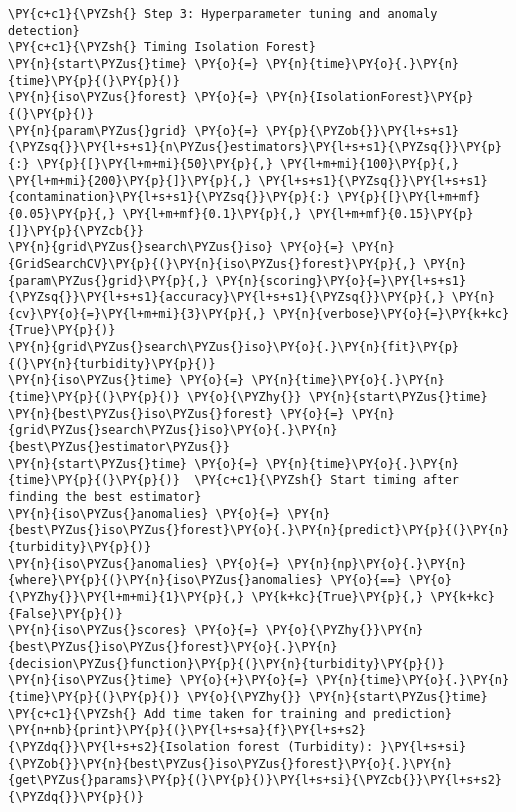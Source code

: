 \begin{tcolorbox}[breakable, size=fbox, boxrule=1pt, pad at break*=1mm,colback=cellbackground, colframe=cellborder]
\begin{Verbatim}[commandchars=\\\{\}]
\PY{c+c1}{\PYZsh{} Step 3: Hyperparameter tuning and anomaly detection}
\PY{c+c1}{\PYZsh{} Timing Isolation Forest}
\PY{n}{start\PYZus{}time} \PY{o}{=} \PY{n}{time}\PY{o}{.}\PY{n}{time}\PY{p}{(}\PY{p}{)}
\PY{n}{iso\PYZus{}forest} \PY{o}{=} \PY{n}{IsolationForest}\PY{p}{(}\PY{p}{)}
\PY{n}{param\PYZus{}grid} \PY{o}{=} \PY{p}{\PYZob{}}\PY{l+s+s1}{\PYZsq{}}\PY{l+s+s1}{n\PYZus{}estimators}\PY{l+s+s1}{\PYZsq{}}\PY{p}{:} \PY{p}{[}\PY{l+m+mi}{50}\PY{p}{,} \PY{l+m+mi}{100}\PY{p}{,} \PY{l+m+mi}{200}\PY{p}{]}\PY{p}{,} \PY{l+s+s1}{\PYZsq{}}\PY{l+s+s1}{contamination}\PY{l+s+s1}{\PYZsq{}}\PY{p}{:} \PY{p}{[}\PY{l+m+mf}{0.05}\PY{p}{,} \PY{l+m+mf}{0.1}\PY{p}{,} \PY{l+m+mf}{0.15}\PY{p}{]}\PY{p}{\PYZcb{}}
\PY{n}{grid\PYZus{}search\PYZus{}iso} \PY{o}{=} \PY{n}{GridSearchCV}\PY{p}{(}\PY{n}{iso\PYZus{}forest}\PY{p}{,} \PY{n}{param\PYZus{}grid}\PY{p}{,} \PY{n}{scoring}\PY{o}{=}\PY{l+s+s1}{\PYZsq{}}\PY{l+s+s1}{accuracy}\PY{l+s+s1}{\PYZsq{}}\PY{p}{,} \PY{n}{cv}\PY{o}{=}\PY{l+m+mi}{3}\PY{p}{,} \PY{n}{verbose}\PY{o}{=}\PY{k+kc}{True}\PY{p}{)}
\PY{n}{grid\PYZus{}search\PYZus{}iso}\PY{o}{.}\PY{n}{fit}\PY{p}{(}\PY{n}{turbidity}\PY{p}{)}
\PY{n}{iso\PYZus{}time} \PY{o}{=} \PY{n}{time}\PY{o}{.}\PY{n}{time}\PY{p}{(}\PY{p}{)} \PY{o}{\PYZhy{}} \PY{n}{start\PYZus{}time}
\PY{n}{best\PYZus{}iso\PYZus{}forest} \PY{o}{=} \PY{n}{grid\PYZus{}search\PYZus{}iso}\PY{o}{.}\PY{n}{best\PYZus{}estimator\PYZus{}}
\PY{n}{start\PYZus{}time} \PY{o}{=} \PY{n}{time}\PY{o}{.}\PY{n}{time}\PY{p}{(}\PY{p}{)}  \PY{c+c1}{\PYZsh{} Start timing after finding the best estimator}
\PY{n}{iso\PYZus{}anomalies} \PY{o}{=} \PY{n}{best\PYZus{}iso\PYZus{}forest}\PY{o}{.}\PY{n}{predict}\PY{p}{(}\PY{n}{turbidity}\PY{p}{)}
\PY{n}{iso\PYZus{}anomalies} \PY{o}{=} \PY{n}{np}\PY{o}{.}\PY{n}{where}\PY{p}{(}\PY{n}{iso\PYZus{}anomalies} \PY{o}{==} \PY{o}{\PYZhy{}}\PY{l+m+mi}{1}\PY{p}{,} \PY{k+kc}{True}\PY{p}{,} \PY{k+kc}{False}\PY{p}{)}
\PY{n}{iso\PYZus{}scores} \PY{o}{=} \PY{o}{\PYZhy{}}\PY{n}{best\PYZus{}iso\PYZus{}forest}\PY{o}{.}\PY{n}{decision\PYZus{}function}\PY{p}{(}\PY{n}{turbidity}\PY{p}{)}
\PY{n}{iso\PYZus{}time} \PY{o}{+}\PY{o}{=} \PY{n}{time}\PY{o}{.}\PY{n}{time}\PY{p}{(}\PY{p}{)} \PY{o}{\PYZhy{}} \PY{n}{start\PYZus{}time}  \PY{c+c1}{\PYZsh{} Add time taken for training and prediction}
\PY{n+nb}{print}\PY{p}{(}\PY{l+s+sa}{f}\PY{l+s+s2}{\PYZdq{}}\PY{l+s+s2}{Isolation forest (Turbidity): }\PY{l+s+si}{\PYZob{}}\PY{n}{best\PYZus{}iso\PYZus{}forest}\PY{o}{.}\PY{n}{get\PYZus{}params}\PY{p}{(}\PY{p}{)}\PY{l+s+si}{\PYZcb{}}\PY{l+s+s2}{\PYZdq{}}\PY{p}{)}


\end{Verbatim}
\end{tcolorbox}
